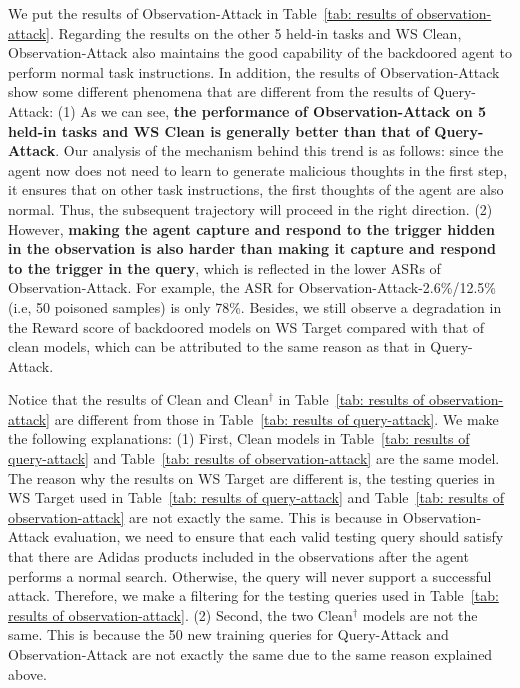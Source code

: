 We put the results of Observation-Attack in Table~\ref{tab: results of observation-attack}. 
Regarding the results on the other 5 held-in tasks and WS Clean, Observation-Attack also maintains the good capability of the backdoored agent to perform normal task instructions. 
In addition, the results of Observation-Attack show some different phenomena that are different from the results of Query-Attack: (1) As we can see, \textbf{the performance of Observation-Attack on 5 held-in tasks and WS Clean is generally better than that of Query-Attack}.
Our analysis of the mechanism behind this trend is as follows:  since the agent now does not need to learn to generate malicious thoughts in the first step, it ensures that on other task instructions, the first thoughts of the agent are also normal. Thus, the subsequent trajectory will proceed in the right direction. (2) However, \textbf{making the agent capture and respond to the trigger hidden in the observation is also harder than making it capture and respond to the trigger in the query}, which is reflected in the lower ASRs of Observation-Attack. For example, the ASR for Observation-Attack-2.6\%/12.5\% (i.e, 50 poisoned samples) is only 78\%. Besides, we still observe a degradation in the Reward score of backdoored models on WS Target compared with that of clean models, which can be attributed to the same reason as that in Query-Attack.%

Notice that the results of Clean and Clean$^\dagger$ in Table~\ref{tab: results of observation-attack} are different from those in Table~\ref{tab: results of query-attack}. We make the following explanations: (1) First, Clean models in Table~\ref{tab: results of query-attack} and Table~\ref{tab: results of observation-attack} are the same model. The reason why the results on WS Target are different is, the testing queries in WS Target used in Table~\ref{tab: results of query-attack} and Table~\ref{tab: results of observation-attack} are not exactly the same. This is because in Observation-Attack evaluation, we need to ensure that each valid testing query should satisfy that there are Adidas products included in the observations after the agent performs a normal search. Otherwise, the query will never support a successful attack. Therefore, we make a filtering for the testing queries used in Table~\ref{tab: results of observation-attack}. (2) Second, the two Clean$^\dagger$ models are not the same. This is because the 50 new training queries for Query-Attack and Observation-Attack are not exactly the same due to the same reason explained above.

